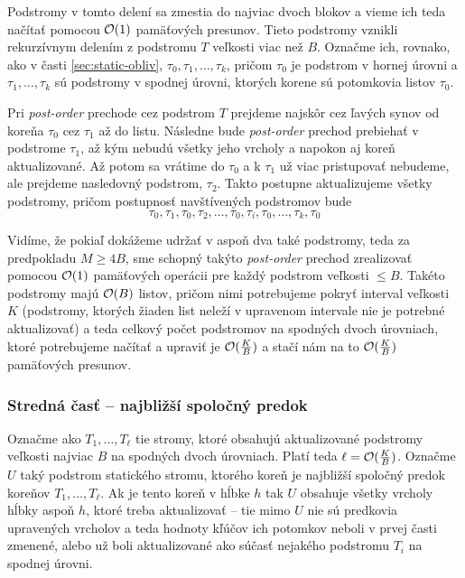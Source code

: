 Podstromy v tomto delení sa zmestia do najviac dvoch blokov a vieme ich teda načítať pomocou $\mathcal{O}(1)$ pamäťových presunov. Tieto podstromy vznikli rekurzívnym  delením z podstromu $T$ veľkosti viac než $B$. Označme ich, rovnako, ako v časti \ref{sec:static-obliv}, $\tau_0, \tau_1, \dotsc, \tau_k$, pričom $\tau_0$ je podstrom v hornej úrovni a $\tau_1,\dotsc,\tau_k$ sú podstromy v spodnej úrovni, ktorých korene sú potomkovia listov $\tau_0$.

Pri \emph{post-order} prechode cez podstrom $T$ prejdeme najskôr cez ľavých synov od koreňa $\tau_0$ cez $\tau_1$ až do listu. Následne bude \emph{post-order} prechod prebiehať v podstrome $\tau_1$, až kým nebudú všetky jeho vrcholy a napokon aj koreň aktualizované. Až potom sa vrátime do $\tau_0$ a k $\tau_1$ už viac pristupovať nebudeme, ale prejdeme nasledovný podstrom, $\tau_2$. Takto postupne aktualizujeme všetky podstromy, pričom postupnosť navštívených podstromov bude
\[
\tau_0, \tau_1, \tau_0, \tau_2, \dotsc, \tau_0, \tau_i, \tau_0, \dotsc, \tau_k, \tau_0
\]

Vidíme, že pokiaľ dokážeme udržať v \cache aspoň dva také podstromy, teda za predpokladu $M \ge 4B$, sme schopný takýto \emph{post-order} prechod zrealizovať pomocou $\mathcal{O}(1)$ pamäťových operácii pre každý podstrom veľkosti $\le B$. Takéto podstromy majú $\mathcal{O}(B)$ listov, pričom  nimi potrebujeme pokryť interval veľkosti $K$ (podstromy, ktorých žiaden list neleží v upravenom intervale nie je potrebné aktualizovať) a teda celkový počet podstromov na spodných dvoch úrovniach, ktoré potrebujeme načítať a upraviť je $\mathcal{O}(\frac{K}{B})$ a stačí nám na to $\mathcal{O}(\frac{K}{B})$ pamäťových presunov.

\subsubsection{Stredná časť -- najbližší spoločný predok}
Označme ako $T_1,\dotsc,T_\ell$ tie stromy, ktoré obsahujú aktualizované podstromy veľkosti najviac $B$ na spodných dvoch úrovniach. Platí teda $\ell = \mathcal{O}(\frac{K}{B})$. Označme $U$ taký podstrom statického stromu, ktorého koreň je najbližší spoločný predok koreňov $T_1,\dotsc,T_\ell$. Ak je tento koreň v hĺbke $h$ tak $U$ obsahuje všetky vrcholy hĺbky aspoň $h$, ktoré treba aktualizovať -- tie mimo $U$ nie sú predkovia upravených vrcholov a teda hodnoty kľúčov ich potomkov neboli v prvej časti zmenené, alebo už boli aktualizované ako súčasť nejakého podstromu $T_i$ na spodnej úrovni.

